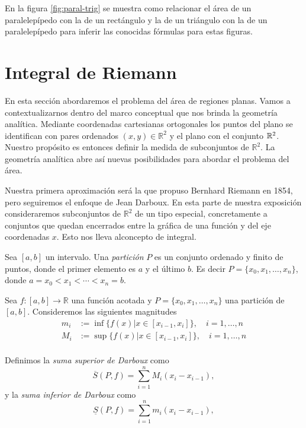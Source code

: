 En la figura \ref{fig:paral-trig} se muestra como relacionar el área de un paralelepípedo con la de un rectángulo y la de un triángulo con la de un paralelepípedo para inferir las conocidas fórmulas para estas figuras.



\section{Integral de Riemann}

En esta sección abordaremos el problema del área de regiones planas. Vamos a contextualizarnos dentro del marco conceptual que nos brinda la geometría analítica. Mediante coordenadas cartesianas ortogonales los puntos del plano se identifican con pares ordenados $(x,y)\in\mathbb{R}^2$ y el plano con el conjunto $\mathbb{R}^2$.  Nuestro propósito es entonces definir la medida de subconjuntos de $\mathbb{R}^2$. La geometría analítica abre así nuevas posibilidades para abordar el problema del área. 

Nuestra primera aproximación será la que propuso Bernhard Riemann en 1854, pero seguiremos  el enfoque de Jean Darboux. En esta parte de nuestra exposición consideraremos subconjuntos de $\mathbb{R}^2$ de un tipo especial, concretamente a conjuntos que quedan encerrados entre la gráfica de una función y del eje coordenadas $x$. Esto nos lleva alconcepto de integral. 


\begin{definicion}[Partición]{} Sea $[a,b]$ un intervalo. Una {\em partición} $P$ es un conjunto ordenado y finito de puntos, donde el primer elemento es $a$ y el último $b$. Es decir $P=\{x_0,x_1,\ldots,x_n\}$, donde $a=x_0<x_1<\cdots<x_n=b$. 
 
\end{definicion}




\begin{definicion}{} Sea $f:[a,b]\to\mathbb{R}$ una función acotada y $P=\{x_0,x_1,\ldots,x_n\}$ una partición de $[a,b]$. Consideremos las siguientes magnitudes
\begin{equation}\label{eq:Mi-mi}
 \begin{split}
    m_i&:=\inf\{f(x)| x\in [x_{i-1},x_i]\},\quad i=1,\ldots,n\\
    M_i&:=\sup\{f(x)| x\in [x_{i-1},x_i]\},\quad i=1,\ldots,n\\
 \end{split}
\end{equation}

Definimos la \emph{suma superior de Darboux} como 
\[
 \overline{S}(P,f)=\sum_{i=1}^nM_i(x_i-x_{i-1}),
\]
y la \emph{suma inferior de Darboux} como 
\[
 \underline{S}(P,f)=\sum_{i=1}^nm_i(x_i-x_{i-1}),
\] 
\end{definicion}

